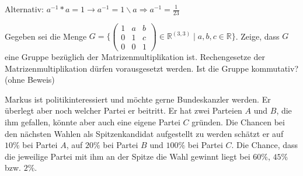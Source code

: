 \documentclass[10pt, a4paper]{exam}
\begin{document}
\begin{questions}
\begin{parts}
\begin{solution}
      Alternativ: $a^{-1}*a=1 \rightarrow a^{-1}=1\backslash a \Rightarrow a^{-1}=\frac{1}{23}$


    \end{solution}
  \end{parts}

  \question Gegeben sei die Menge $G=\{ \begin{pmatrix} 1&a&b\\0&1&c\\0&0&1 \end{pmatrix} \in\mathbb{R}^{(3,3)}\mid a,b,c\in\mathbb{R}\}$. Zeige, dass $G$ eine Gruppe bezüglich der Matrizenmultiplikation ist. Rechengesetze der Matrizenmultiplikation dürfen vorausgesetzt werden. Ist die Gruppe kommutativ? (ohne Beweis)
  \begin{solution}
  \end{solution}

  \question Markus ist politikinteressiert und möchte gerne Bundeskanzler werden. Er überlegt aber noch welcher Partei er beitritt. Er hat zwei Parteien $A$ und $B$, die ihm gefallen, könnte aber auch eine eigene Partei $C$ gründen. Die Chancen bei den nächsten Wahlen als Spitzenkandidat aufgestellt zu werden schätzt er auf $10\%$ bei Partei $A$, auf $20\%$ bei Partei $B$ und $100\%$ bei Partei $C$. Die Chance, dass die jeweilige Partei mit ihm an der Spitze die Wahl gewinnt liegt bei $60\%$, $45\%$ bzw. $2\%$.


\end{questions}
\end{document}
